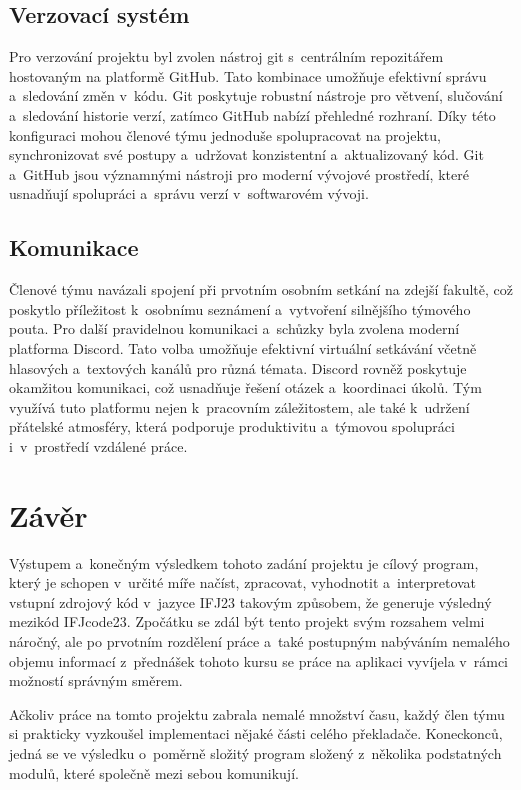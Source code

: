 \documentclass[a4paper, 11pt]{article}
\begin{document}
\subsection{Verzovací systém}
    Pro verzování projektu byl zvolen nástroj git s~centrálním repozitářem hostovaným na platformě GitHub.
    Tato kombinace umožňuje efektivní správu a~sledování změn v~kódu.
    Git poskytuje robustní nástroje pro větvení, slučování a~sledování historie verzí, zatímco GitHub nabízí přehledné rozhraní.
    Díky této konfiguraci mohou členové týmu jednoduše spolupracovat na projektu, synchronizovat své postupy a~udržovat konzistentní a~aktualizovaný kód.
    Git a~GitHub jsou významnými nástroji pro moderní vývojové prostředí, které usnadňují spolupráci a~správu verzí v~softwarovém vývoji.

\subsection{Komunikace}
    Členové týmu navázali spojení při prvotním osobním setkání na zdejší fakultě, což poskytlo příležitost k~osobnímu seznámení a~vytvoření silnějšího týmového pouta.
    Pro další pravidelnou komunikaci a~schůzky byla zvolena moderní platforma Discord.
    Tato volba umožňuje efektivní virtuální setkávání včetně hlasových a~textových kanálů pro různá témata.
    Discord rovněž poskytuje okamžitou komunikaci, což usnadňuje řešení otázek a~koordinaci úkolů.
    Tým využívá tuto platformu nejen k~pracovním záležitostem, ale také k~udržení přátelské atmosféry, která podporuje produktivitu a~týmovou spolupráci i~v~prostředí vzdálené práce.

\newpage

\section{Závěr}
    Výstupem a~konečným výsledkem tohoto zadání projektu je cílový program, který je schopen v~určité míře načíst, zpracovat, vyhodnotit a~interpretovat vstupní zdrojový kód v~jazyce IFJ23 takovým způsobem, že generuje výsledný mezikód IFJcode23.
    Zpočátku se zdál být tento projekt svým rozsahem velmi náročný, ale po prvotním rozdělení práce a~také postupným nabýváním nemalého objemu informací z~přednášek tohoto kursu se práce na aplikaci vyvíjela v~rámci možností správným směrem.

    Ačkoliv práce na tomto projektu zabrala nemalé množství času, každý člen týmu si prakticky vyzkoušel implementaci nějaké části celého překladače.
    Koneckonců, jedná se ve výsledku o~poměrně složitý program složený z~několika podstatných modulů, které společně mezi sebou komunikují.
\end{document}
